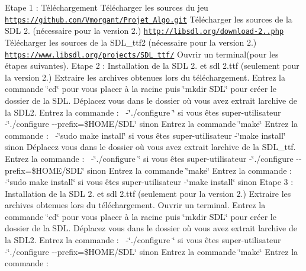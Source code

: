 Etape 1 \+: Téléchargement Télécharger les sources du jeu \href{https://github.com/Vmorgant/Projet_Algo.git}{\tt https\+://github.\+com/\+Vmorgant/\+Projet\+\_\+\+Algo.\+git} Télécharger les sources de la S\+DL 2. (nécessaire pour la version 2.) \href{http://libsdl.org/download-2.0.php}{\tt http\+://libsdl.\+org/download-\/2..\+php} Télécharger les sources de la S\+D\+L\+\_\+ttf2 (nécessaire pour la version 2.) \href{https://www.libsdl.org/projects/SDL_ttf/}{\tt https\+://www.\+libsdl.\+org/projects/\+S\+D\+L\+\_\+ttf/} Ouvrir un terminal(pour les étapes suivantes). Etape 2 \+: Installation de la S\+DL 2. et sdl 2.\+ttf (seulement pour la version 2.) Extraire les archives obtenues lors du téléchargement. Entrez la commande \char`\"{}cd\char`\"{} pour vous placer à la racine puis \char`\"{}mkdir S\+D\+L\char`\"{} pour créer le dossier de la S\+DL. Déplacez vous dans le dossier où vous avez extrait l\textquotesingle{}archive de la S\+D\+L2. Entrez la commande \+:~\newline
 -\/\char`\"{}./configure \char`\"{} si vous êtes super-\/utilisateur -\/\char`\"{}./configure -\/-\/prefix=\$\+H\+O\+M\+E/\+S\+D\+L\char`\"{} sinon Entrez la commande \char`\"{}make\char`\"{} Entrez la commande \+:~\newline
 -\/\char`\"{}sudo make install\char`\"{} si vous êtes super-\/utilisateur -\/\char`\"{}make install\char`\"{} sinon Déplacez vous dans le dossier où vous avez extrait l\textquotesingle{}archive de la S\+D\+L\+\_\+ttf. Entrez la commande \+:~\newline
 -\/\char`\"{}./configure \char`\"{} si vous êtes super-\/utilisateur -\/\char`\"{}./configure -\/-\/prefix=\$\+H\+O\+M\+E/\+S\+D\+L\char`\"{} sinon Entrez la commande \char`\"{}make\char`\"{} Entrez la commande \+:~\newline
 -\/\char`\"{}sudo make install\char`\"{} si vous êtes super-\/utilisateur -\/\char`\"{}make install\char`\"{} sinon Etape 3 \+: Installation de la S\+DL 2. et sdl 2.\+ttf (seulement pour la version 2.) Extraire les archives obtenues lors du téléchargement. Ouvrir un terminal. Entrez la commande \char`\"{}cd\char`\"{} pour vous placer à la racine puis \char`\"{}mkdir S\+D\+L\char`\"{} pour créer le dossier de la S\+DL. Déplacez vous dans le dossier où vous avez extrait l\textquotesingle{}archive de la S\+D\+L2. Entrez la commande \+:~\newline
 -\/\char`\"{}./configure \char`\"{} si vous êtes super-\/utilisateur~\newline
 -\/\char`\"{}./configure -\/-\/prefix=\$\+H\+O\+M\+E/\+S\+D\+L\char`\"{} sinon Entrez la commande \char`\"{}make\char`\"{} Entrez la commande \+:~\newline
